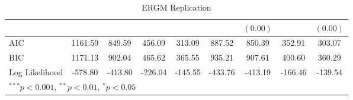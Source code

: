 \documentclass[fleqn,12pt]{wlscirep}
\begin{document}
\begin{landscape}
\begin{table}
\begin{center}
\begin{tabular}{l c c c c c c c c }
                        &               &               &               &               &               & $(0.00)$      &               & $(0.00)$      \\
\hline
AIC                     & 1161.59       & 849.59        & 456.09        & 313.09        & 887.52        & 850.39        & 352.91        & 303.07        \\
BIC                     & 1171.13       & 902.04        & 465.62        & 365.55        & 935.21        & 907.61        & 400.60        & 360.29        \\
Log Likelihood          & -578.80       & -413.80       & -226.04       & -145.55       & -433.76       & -413.19       & -166.46       & -139.54       \\
\hline
\multicolumn{9}{l}{\scriptsize{$^{***}p<0.001$, $^{**}p<0.01$, $^*p<0.05$}}
\end{tabular}
\caption{ERGM Replication}
\label{table:coefficients}
\end{center}
\end{table}
\end{landscape}
\restoregeometry
\end{document}
